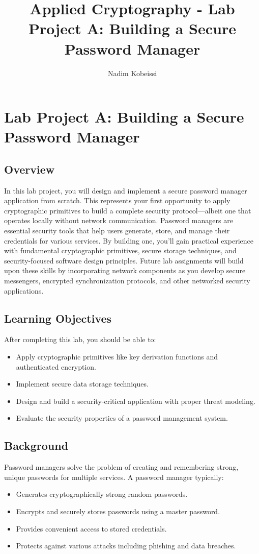 \documentclass[10pt,a4paper,american]{exam}
\title{Applied Cryptography - Lab Project A: Building a Secure Password Manager}
\author{Nadim Kobeissi}
\begin{document}
\classhandoutheader
\section*{Lab Project A: Building a Secure Password Manager}

\subsection*{Overview}
In this lab project, you will design and implement a secure password manager application from scratch. This represents your first opportunity to apply cryptographic primitives to build a complete security protocol—albeit one that operates locally without network communication. Password managers are essential security tools that help users generate, store, and manage their credentials for various services. By building one, you'll gain practical experience with fundamental cryptographic primitives, secure storage techniques, and security-focused software design principles. Future lab assignments will build upon these skills by incorporating network components as you develop secure messengers, encrypted synchronization protocols, and other networked security applications.

\subsection*{Learning Objectives}
After completing this lab, you should be able to:
\begin{itemize}
	\item Apply cryptographic primitives like key derivation functions and authenticated encryption.
	\item Implement secure data storage techniques.
	\item Design and build a security-critical application with proper threat modeling.
	\item Evaluate the security properties of a password management system.
\end{itemize}

\subsection*{Background}
Password managers solve the problem of creating and remembering strong, unique passwords for multiple services. A password manager typically:
\begin{itemize}
	\item Generates cryptographically strong random passwords.
	\item Encrypts and securely stores passwords using a master password.
	\item Provides convenient access to stored credentials.
	\item Protects against various attacks including phishing and data breaches.
\end{itemize}
\end{document}
